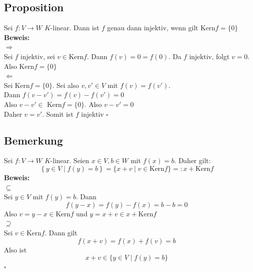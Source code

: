 \subsection{Proposition} %
\label{sub:proposition}
Sei $f : V \to W$ \(K\)-linear. 
Dann ist $f$ genau dann injektiv, wenn gilt Kern$f =  \{ 0\}$ 
\vspace{\baselineskip} \\
\textbf{Beweis:} \\
\grqq $\Rightarrow$ \grqq \\
Sei $f$ injektiv, sei $v \in \text{Kern}f$. Dann $f(v)=0 = f(0)$. Da $f$ injektiv, folgt $v=0$. Also Kern$f= \{ 0\}$
\vspace{\baselineskip} \\
\grqq $\Leftarrow$ \grqq \\
Sei Kern$f = \{0\}$. Sei also $v,v' \in V$ mit $f(v)=f(v')$. \\
Dann $f(v-v')= f(v)-f(v')=0$ 
\vspace{9pt} \\
Also $v-v' \in \text{ Kern} f = \{0\}$. Also $v-v' =0$ \\
Daher $v=v'$. Somit ist $f$ injektiv \hfill $\square$

\subsection{Bemerkung} %
\label{sub:bemerkung}
Sei $f : V \to W$ \(K\)-linear. Seien $x \in V , b \in W$ mit $f(x)=b$. Daher gilt:
\[
	\left\{ y \in V \mid f(y)=b \right\} =  \{ x +v \mid v \in \text{Kern} f \} =: x + \text{Kern} f
\]
\textbf{Beweis:} 
\vspace{\baselineskip} \\
\grqq $\subseteq$\grqq \\
Sei $y \in V$ mit $f(y)=b$. Dann 
\[
	f(y-x)= f(y)-f(x)= b-b=0
\]
Also $v=y-x \in \text{Kern} f$ und $y=x+v \in x + \text{Kern} f$
\vspace{\baselineskip} \\
\grqq $\supseteq$\grqq \\
Sei $v \in \text{Kern} f.$ Dann gilt
\[
	f(x+v)= f(x) +f(v) =b
\]
Also ist 
\[
	x+v \in \{ y \in V \mid f(y)=b  \} 
\]
\hfill $\square$

